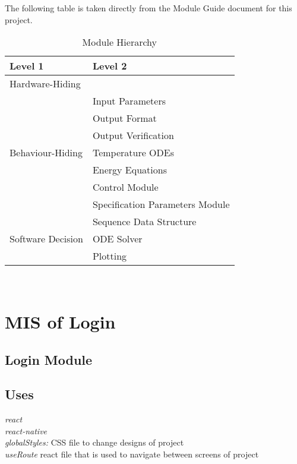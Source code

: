 \documentclass[12pt, titlepage]{article}
\begin{document}
The following table is taken directly from the Module Guide document for this project.

\begin{table}[h!]
	\centering
	\begin{tabular}{p{} p{}}
		\toprule
		\textbf{Level 1} & \textbf{Level 2}\\
		\midrule
		
		{Hardware-Hiding} & ~ \\
		\midrule
		
		\multirow{7}{0.3\textwidth}{Behaviour-Hiding} & Input Parameters\\
		& Output Format\\
		& Output Verification\\
		& Temperature ODEs\\
		& Energy Equations\\ 
		& Control Module\\
		& Specification Parameters Module\\
		\midrule
		
		\multirow{3}{0.3\textwidth}{Software Decision} & {Sequence Data Structure}\\
		& ODE Solver\\
		& Plotting\\
		\bottomrule
		
	\end{tabular}
	\caption{Module Hierarchy}
	\label{TblMH}
\end{table}

\newpage
~\newpage

\section{MIS of Login} \label{Module} 

\subsection{Login Module}

\subsection{Uses}
{\textit{react}}\\
{\textit{react-native}}\\
{\textit{globalStyles:} CSS file to change designs of project}\\
{\textit{useRoute} react file that is used to navigate between screens of project}
\end{document}
